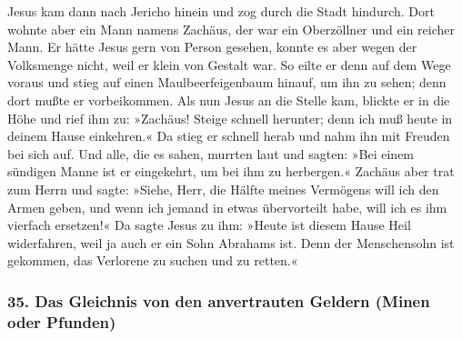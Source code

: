  Jesus kam dann nach Jericho hinein und zog durch die
Stadt hindurch.  Dort wohnte aber ein Mann namens Zachäus,
der war ein Oberzöllner und ein reicher Mann.  Er hätte
Jesus gern von Person gesehen, konnte es aber wegen der Volksmenge
nicht, weil er klein von Gestalt war.  So eilte er denn
auf dem Wege voraus und stieg auf einen Maulbeerfeigenbaum hinauf, um
ihn zu sehen; denn dort mußte er vorbeikommen.  Als nun
Jesus an die Stelle kam, blickte er in die Höhe und rief ihm zu:
»Zachäus! Steige schnell herunter; denn ich muß heute in deinem Hause
einkehren.«  Da stieg er schnell herab und nahm ihn mit
Freuden bei sich auf.  Und alle, die es sahen, murrten
laut und sagten: »Bei einem sündigen Manne ist er eingekehrt, um bei ihm
zu herbergen.«  Zachäus aber trat zum Herrn und sagte:
»Siehe, Herr, die Hälfte meines Vermögens will ich den Armen geben, und
wenn ich jemand in etwas übervorteilt habe, will ich es ihm vierfach
ersetzen!«  Da sagte Jesus zu ihm: »Heute ist diesem Hause
Heil widerfahren, weil ja auch er ein Sohn Abrahams ist. 
Denn der Menschensohn ist gekommen, das Verlorene zu suchen und zu
retten.«

\hypertarget{das-gleichnis-von-den-anvertrauten-geldern-minen-oder-pfunden}{%
\subsubsection{35. Das Gleichnis von den anvertrauten Geldern (Minen
oder
Pfunden)}\label{das-gleichnis-von-den-anvertrauten-geldern-minen-oder-pfunden}}


